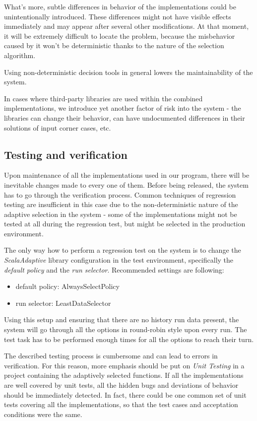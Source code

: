 What's more, subtle differences in behavior of the implementations could be unintentionally introduced. These differences might not have visible effects immediately and may appear after several other modifications. At that moment, it will be extremely difficult to locate the problem, because the misbehavior caused by it won't be deterministic thanks to the nature of the selection algorithm.

Using non-deterministic decision tools in general lowers the maintainability of the system.

In cases where third-party libraries are used within the combined implementations, we introduce yet another factor of risk into the system - the libraries can change their behavior, can have undocumented differences in their solutions of input corner cases, etc.

\subsection{Testing and verification}

Upon maintenance of all the implementations used in our program, there will be inevitable changes made to every one of them. Before being released, the system has to go through the verification process. Common techniques of regression testing are insufficient in this case due to the non-deterministic nature of the adaptive selection in the system - some of the implementations might not be tested at all during the regression test, but might be selected in the production environment.

The only way how to perform a regression test on the system is to change the \textit{ScalaAdaptive} library configuration in the test environment, specifically the \textit{default policy} and the \textit{run selector}. Recommended settings are following:

 \begin{itemize}
 	\item default policy: AlwaysSelectPolicy
 	\item run selector: LeastDataSelector
 \end{itemize}

Using this setup and ensuring that there are no history run data present, the system will go through all the options in round-robin style upon every run. The test task has to be performed enough times for all the options to reach their turn.

The described testing process is cumbersome and can lead to errors in verification. For this reason, more emphasis should be put on \textit{Unit Testing} in a project containing the adaptively selected functions. If all the implementations are well covered by unit tests, all the hidden bugs and deviations of behavior should be immediately detected. In fact, there could be one common set of unit tests covering all the implementations, so that the test cases and acceptation conditions were the same.

